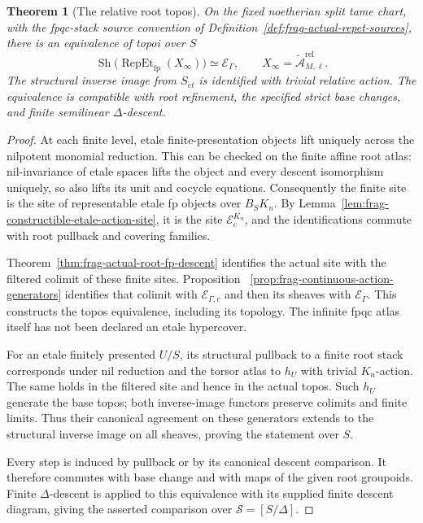 \documentclass[11pt]{article}
\newtheorem{theorem}{Theorem}[section]
\theoremstyle{definition}
\theoremstyle{remark}
\begin{document}
\begin{theorem}[The relative root topos]
\label{thm:frag-actual-root-continuous-topos}
On the fixed noetherian split tame chart, with the fpqc-stack source
convention of Definition~\ref{def:frag-actual-repet-sources}, there is
an equivalence of topoi over $S$
\[
\operatorname{Sh}\bigl(\operatorname{RepEt}_{\mathrm{fp}}(X_\infty)\bigr)
 \simeq \mathscr E_\Gamma,
\qquad X_\infty=\widetilde{\mathcal A}_{M,\ell}^{\mathrm{rel}}.
\]
The structural inverse image from $S_{\acute et}$ is identified with
trivial relative action.  The equivalence is compatible with root
refinement, the specified strict base changes, and finite semilinear
$\Delta$-descent.
\end{theorem}

\begin{proof}
At each finite level, etale finite-presentation objects lift uniquely
across the nilpotent monomial reduction.  This can be checked on the
finite affine root atlas: nil-invariance of etale spaces lifts the
object and every descent isomorphism uniquely, so also lifts its
unit and cocycle equations.  Consequently the finite site is the
site of representable etale fp objects over $B_SK_n$.  By
Lemma~\ref{lem:frag-constructible-etale-action-site}, it is the site
$\mathscr E_c^{K_n}$, and the identifications commute with root
pullback and covering families.

Theorem~\ref{thm:frag-actual-root-fp-descent} identifies the actual
site with the filtered colimit of these finite sites.  Proposition~
\ref{prop:frag-continuous-action-generators} identifies that colimit
with $\mathscr E_{\Gamma,c}$ and then its sheaves with
$\mathscr E_\Gamma$.  This constructs the topos equivalence, including
its topology.  The infinite fpqc atlas itself has not been declared
an etale hypercover.

For an etale finitely presented $U/S$, its structural pullback to a
finite root stack corresponds under nil reduction and the torsor
atlas to $h_U$ with trivial $K_n$-action.  The same holds in the
filtered site and hence in the actual topos.  Such $h_U$ generate the
base topos; both inverse-image functors preserve colimits and finite
limits.  Thus their canonical agreement on these generators extends
to the structural inverse image on all sheaves, proving the statement
over $S$.

Every step is induced by pullback or by its canonical descent
comparison.  It therefore commutes with base change and with maps
of the given root groupoids.  Finite $\Delta$-descent is applied to
this equivalence with its supplied finite descent diagram, giving the asserted
comparison over $\mathscr S=[S/\Delta]$.
\end{proof}
\end{document}
